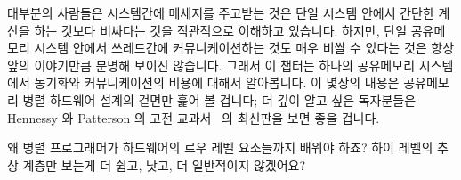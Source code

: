 

대부분의 사람들은 시스템간에 메세지를 주고받는 것은 단일 시스템 안에서 간단한
계산을 하는 것보다 비싸다는 것을 직관적으로 이해하고 있습니다.
하지만, 단일 공유메모리 시스템 안에서 쓰레드간에 커뮤니케이션하는 것도 매우
비쌀 수 있다는 것은 항상 앞의 이야기만큼 분명해 보이진 않습니다.
그래서 이 챕터는 하나의 공유메모리 시스템에서 동기화와 커뮤니케이션의 비용에
대해서 알아봅니다.
이 몇장의 내용은 공유메모리 병렬 하드웨어 설계의 겉면만 훑어 볼 겁니다; 더 깊이
알고 싶은 독자분들은 Hennessy 와 Patterson 의 고전 교과서~\cite{Hennessy95a} 의
최신판을 보면 좋을 겁니다.

\iffalse
Most people have an intuitive understanding that passing messages between
systems is considerably more expensive than performing simple calculations
within the confines of a single system.
However, it is not always so clear that communicating among threads within
the confines of a single shared-memory system can also be quite expensive.
This chapter therefore looks at the cost of synchronization and communication
within a shared-memory system.
These few pages can do no more than scratch the surface of shared-memory
parallel hardware design; readers desiring more detail would do well
to start with a recent edition of Hennessy and Patterson's classic
text~\cite{Hennessy95a}.
\fi

\QuickQuiz{}
	왜 병렬 프로그래머가 하드웨어의 로우 레벨 요소들까지 배워야 하죠?
	하이 레벨의 추상 계층만 보는게 더 쉽고, 낫고, 더 일반적이지 않겠어요?

